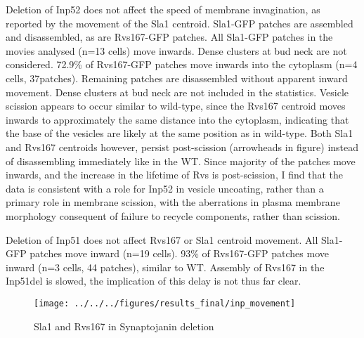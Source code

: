 	\vspace{5mm}
	Deletion of Inp52 does not affect the speed of membrane invagination, as reported by the movement of the Sla1 centroid. Sla1-GFP patches are assembled and disassembled, as are Rvs167-GFP patches. All Sla1-GFP patches in the movies analysed (n=13 cells) move inwards.  Dense clusters at bud neck are not considered. 72.9\% of Rvs167-GFP patches move inwards into the cytoplasm (n=4 cells, 37patches). Remaining patches are disassembled without apparent inward movement. Dense clusters at bud neck are not included in the statistics. Vesicle scission appears to occur similar to wild-type, since the Rvs167 centroid moves inwards to approximately the same distance into the cytoplasm, indicating that the base of the vesicles are likely at the same position as in wild-type. Both Sla1 and Rvs167 centroids however, persist post-scission (arrowheads in figure) instead of disassembling immediately like in the WT. Since majority of the patches move inwards, and the increase in the lifetime of Rvs is post-scission, I find that the data is consistent with a role for Inp52 in vesicle uncoating, rather than a primary role in membrane scission, with the aberrations in plasma membrane morphology consequent of failure to recycle components, rather than scission. 

	\vspace{5mm}
	Deletion of Inp51 does not affect Rvs167 or Sla1 centroid movement. All Sla1-GFP patches move inward (n=19 cells). 93\% of Rvs167-GFP patches move inward (n=3 cells, 44 patches), similar to WT. Assembly of Rvs167 in the Inp51del is slowed, the implication of this delay is not thus far clear. 

	\begin{figure}
	\centering
	\texttt{[image: ../../../figures/results\_final/inp\_movement]}
	\caption{Sla1 and Rvs167 in Synaptojanin deletion \label{fig5}}
	\end{figure}
	
